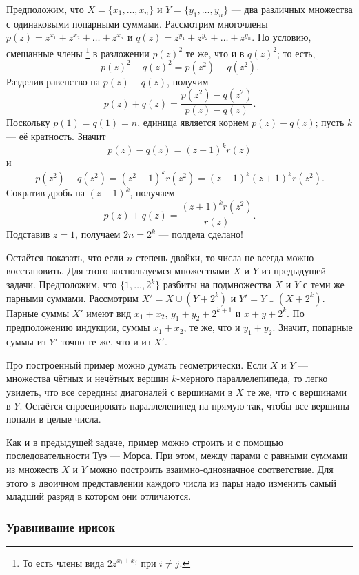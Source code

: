 Предположим, что $X = \{x_1 , \dots , x_n\}$ и $Y = \{y_1 , \dots , y_n\}$ --- два различных множества с одинаковыми попарными суммами.
Рассмотрим многочлены
$p(z)=z^{x_1} + z^{x_2} + \dots + z^{x_n}$
и 
$q(z)=z^{y_1} + z^{y_2} + \dots + z^{y_n}$.
По условию, смешанные члены%
\footnote{То есть члены вида $2z^{x_i+x_j}$ при $i\ne j$.} в разложении $p(z)^2$ те же, что и в $q(z)^2$;
то есть,
\[p(z)^2 -q(z)^2 = p(z^2 )-q(z^2).\]
Разделив равенство на $p(z) - q(z)$, получим
\[p(z) + q(z) =
\frac{p(z^2 ) - q(z^2 )}{p(z) - q(z)}.
\]
Поскольку $p(1) = q(1) = n$,
единица является корнем $p(z) - q(z)$; пусть $k$ --- её кратность.
Значит
\[p(z) - q(z) = (z - 1)^k r(z)\]
и
\[p(z^2 ) - q(z^2 ) = (z^2 - 1)^k r(z^2 )= (z - 1)^k (z + 1)^k r(z^2).\]
Сократив дробь на $(z - 1)^k$, получаем
\[p(z) + q(z) =
\frac{(z + 1)^k r(z^2)}{r(z)}.
\]
Подставив $z = 1$, получаем $2n = 2^k$ --- полдела сделано!

Остаётся показать, что если $n$ степень двойки, то
числа не всегда можно восстановить.
Для этого воспользуемся множествами $X$ и $Y$ из предыдущей задачи.
Предположим, что $\{1, \dots , 2^k\}$ разбиты на подмножества $X$ и $Y$ с теми же парными суммами.
Рассмотрим $X' = X \cup (Y + 2^k)$ и $Y' = Y \cup (X + 2^k)$.
Парные суммы $X'$ имеют вид $x_1 + x_2$, $y_1 + y_2 + 2^{k+1}$ и $x + y + 2^k$.
По предположению индукции,
суммы $x_1 + x_2$, те же, что и $y_1 + y_2$.
Значит, попарные суммы из $Y'$ точно те же, что и из $X'$.

\begin{addedbytheeditors}
Про построенный пример можно думать геометрически.
Если $X$ и $Y$ --- множества чётных и нечётных вершин $k$-мерного параллелепипеда, то легко увидеть, что все середины диагоналей с вершинами в $X$ те же, что с вершинами в $Y$.
Остаётся спроецировать параллелепипед на прямую так, чтобы все вершины попали в целые числа.

Как и в предыдущей задаче, пример можно строить и с помощью последовательности Туэ --- Морса.
При этом, между парами с равными суммами из множеств $X$ и $Y$ можно построить взаимно-однозначное соответствие.
Для этого в двоичном представлении каждого числа из пары надо изменить самый младший разряд в котором они отличаются.
\pr
\end{addedbytheeditors}

\subsubsection*{Уравнивание ирисок}

